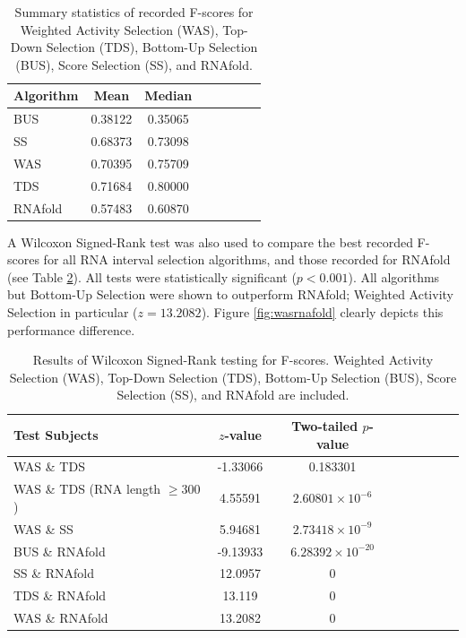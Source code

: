 \documentclass{cshonours}
\begin{document}
\begin{table}
\centering
\begin{tabular}{l*{6}{c}r}
Algorithm	& Mean & Median \\
\hline
BUS &  0.38122    &    0.35065   \\
SS & 0.68373    &    0.73098  \\
WAS & 0.70395   &     0.75709  \\
TDS & 0.71684   &     0.80000  \\
\hline
RNAfold & 0.57483    &    0.60870 \\
\end{tabular}

\caption{Summary statistics of recorded F-scores for Weighted Activity Selection (WAS), Top-Down Selection (TDS), Bottom-Up Selection (BUS), Score Selection (SS), and RNAfold.}
\label{tab:summaryselection}
\end{table}



A Wilcoxon Signed-Rank test was also used to compare the best recorded F-scores for all RNA interval selection algorithms, and those recorded for RNAfold (see Table \ref{tab:wilcoxonselection}). All tests were statistically significant ($p < 0.001$). All algorithms but Bottom-Up Selection were shown to outperform RNAfold; Weighted Activity Selection in particular ($z = 13.2082$). Figure \ref{fig:wasrnafold} clearly depicts this performance difference.


\begin{table}
\centering
\begin{tabular}{l*{6}{c}r}
Test Subjects	& $z$-value & Two-tailed $p$-value \\
\hline
WAS \& TDS 	& -1.33066 &	0.183301 \\
WAS \& TDS (RNA length $\geq 300$)	& 4.55591 &	$2.60801 \times 10 ^{-6}$ \\
WAS \& SS & 5.94681 &	$2.73418 \times 10^{-9}$  \\
\hline
BUS \& RNAfold & -9.13933 &	$6.28392 \times 10^{-20}$  \\
SS \& RNAfold & 12.0957 &	0  \\
TDS \& RNAfold & 13.119 &	0  \\
WAS \& RNAfold & 13.2082 &	0  \\
\end{tabular}

\caption{Results of Wilcoxon Signed-Rank testing for F-scores. Weighted Activity Selection (WAS), Top-Down Selection (TDS), Bottom-Up Selection (BUS), Score Selection (SS), and RNAfold are included.}
\label{tab:wilcoxonselection}
\end{table}
\end{document}
